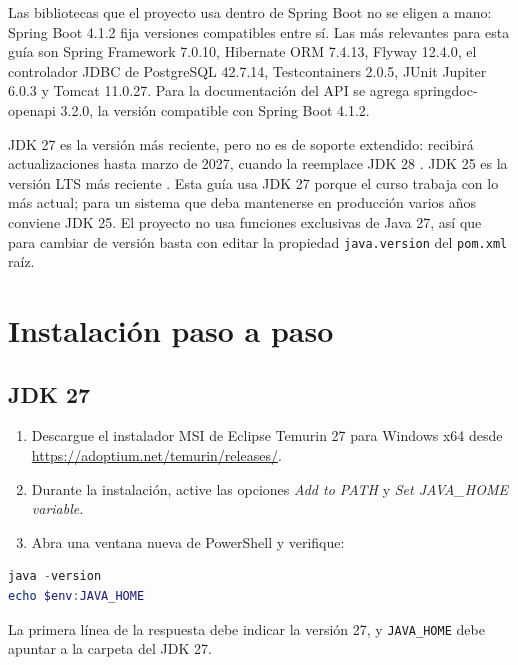 Las bibliotecas que el proyecto usa dentro de Spring Boot no se eligen a mano: Spring Boot 4.1.2 fija versiones compatibles entre sí. Las más relevantes para esta guía son Spring Framework 7.0.10, Hibernate ORM 7.4.13, Flyway 12.4.0, el controlador JDBC de PostgreSQL 42.7.14, Testcontainers 2.0.5, JUnit Jupiter 6.0.3 y Tomcat 11.0.27. Para la documentación del API se agrega springdoc-openapi 3.2.0, la versión compatible con Spring Boot 4.1.2.

\begin{infoBox}[title={¿JDK 27 o JDK 25?}]
	JDK 27 es la versión más reciente, pero no es de soporte extendido: recibirá actualizaciones hasta marzo de 2027, cuando la reemplace JDK 28 \cite{oracle2026jdk27}. JDK 25 es la versión LTS más reciente \cite{adoptium2026releases}. Esta guía usa JDK 27 porque el curso trabaja con lo más actual; para un sistema que deba mantenerse en producción varios años conviene JDK 25. El proyecto no usa funciones exclusivas de Java 27, así que para cambiar de versión basta con editar la propiedad \texttt{java.version} del \texttt{pom.xml} raíz.
\end{infoBox}

\section{Instalación paso a paso}

\subsection{JDK 27}

\begin{enumerate}
	\item Descargue el instalador MSI de Eclipse Temurin 27 para Windows x64 desde \url{https://adoptium.net/temurin/releases/}.
	\item Durante la instalación, active las opciones \emph{Add to PATH} y \emph{Set JAVA\_HOME variable}.
	\item Abra una ventana nueva de PowerShell y verifique:
\end{enumerate}

\begin{lstlisting}[language=powershell,numbers=none]
java -version
echo $env:JAVA_HOME
\end{lstlisting}

La primera línea de la respuesta debe indicar la versión 27, y \texttt{JAVA\_HOME} debe apuntar a la carpeta del JDK 27.


